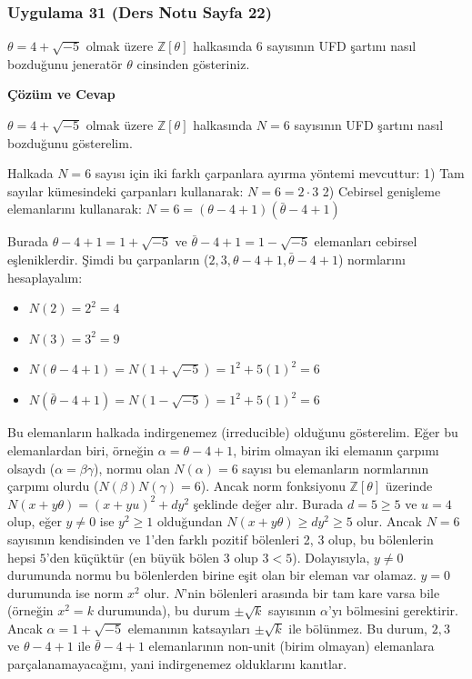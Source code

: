 \documentclass[11pt, a4paper]{article}
\newenvironment{cozum}{
    \vspace{0.5cm}
    \noindent\textcolor{green!60!black}{\faCheckCircle\enspace \textbf{\Large Çözüm ve Cevap}}\par\vspace{0.2cm}
}{}
\begin{document}
\subsubsection{Uygulama 31 (Ders Notu Sayfa 22)}
\begin{sorubox}
$\theta = 4 + \sqrt{-5}$ olmak üzere $\mathbb{Z}[\theta]$ halkasında $6$ sayısının UFD şartını nasıl bozduğunu jeneratör $\theta$ cinsinden gösteriniz.
\end{sorubox}
\begin{cozum}
$\theta = 4 + \sqrt{-5}$ olmak üzere $\mathbb{Z}[\theta]$ halkasında $N = 6$ sayısının UFD şartını nasıl bozduğunu gösterelim.

Halkada $N = 6$ sayısı için iki farklı çarpanlara ayırma yöntemi mevcuttur:
1) Tam sayılar kümesindeki çarpanları kullanarak: $N = 6 = 2 \cdot 3$
2) Cebirsel genişleme elemanlarını kullanarak: $N = 6 = (\theta - 4 + 1)(\bar{\theta} - 4 + 1)$

Burada $\theta - 4 + 1 = 1 + \sqrt{-5}$ ve $\bar{\theta} - 4 + 1 = 1 - \sqrt{-5}$ elemanları cebirsel eşleniklerdir. Şimdi bu çarpanların ($2, 3, \theta - 4 + 1, \bar{\theta} - 4 + 1$) normlarını hesaplayalım:
\begin{itemize}
    \item $N(2) = 2^2 = 4$
    \item $N(3) = 3^2 = 9$
    \item $N(\theta - 4 + 1) = N(1 + \sqrt{-5}) = 1^2 + 5(1)^2 = 6$
    \item $N(\bar{\theta} - 4 + 1) = N(1 - \sqrt{-5}) = 1^2 + 5(1)^2 = 6$
\end{itemize}

Bu elemanların halkada indirgenemez (irreducible) olduğunu gösterelim. Eğer bu elemanlardan biri, örneğin $\alpha = \theta - 4 + 1$, birim olmayan iki elemanın çarpımı olsaydı ($\alpha = \beta \gamma$), normu olan $N(\alpha) = 6$ sayısı bu elemanların normlarının çarpımı olurdu ($N(\beta)N(\gamma) = 6$). Ancak norm fonksiyonu $\mathbb{Z}[\theta]$ üzerinde $N(x+y\theta) = (x+yu)^2 + dy^2$ şeklinde değer alır. Burada $d = 5 \ge 5$ ve $u = 4$ olup, eğer $y \neq 0$ ise $y^2 \ge 1$ olduğundan $N(x+y\theta) \ge dy^2 \ge 5$ olur. Ancak $N = 6$ sayısının kendisinden ve 1'den farklı pozitif bölenleri 2, 3 olup, bu bölenlerin hepsi $5$'den küçüktür (en büyük bölen 3 olup $3 < 5$). Dolayısıyla, $y \neq 0$ durumunda normu bu bölenlerden birine eşit olan bir eleman var olamaz. $y = 0$ durumunda ise norm $x^2$ olur. $N$'nin bölenleri arasında bir tam kare varsa bile (örneğin $x^2 = k$ durumunda), bu durum $\pm \sqrt{k}$ sayısının $\alpha$'yı bölmesini gerektirir. Ancak $\alpha = 1+\sqrt{-5}$ elemanının katsayıları $\pm \sqrt{k}$ ile bölünmez. Bu durum, $2, 3$ ve $\theta - 4 + 1$ ile $\bar{\theta} - 4 + 1$ elemanlarının non-unit (birim olmayan) elemanlara parçalanamayacağını, yani indirgenemez olduklarını kanıtlar.


\end{cozum}
\end{document}
